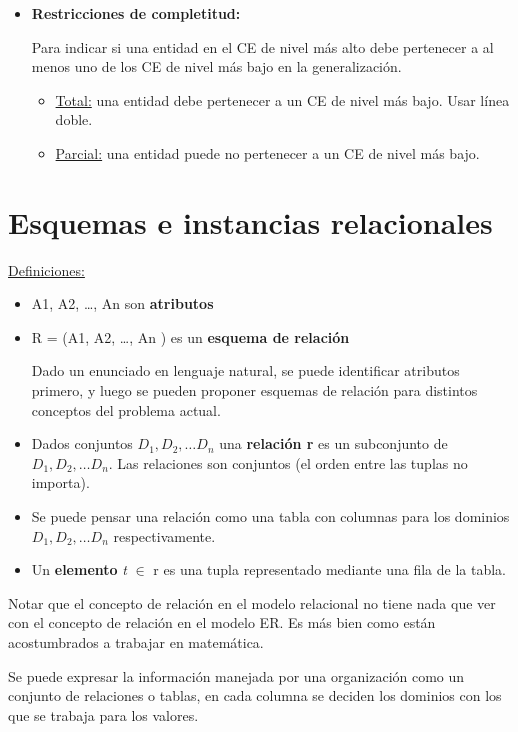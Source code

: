 \documentclass[12pt,a4paper]{report}
\begin{document}
\begin{itemize}
			\item \textbf{Restricciones de completitud:} 
			\par Para indicar si una entidad en el CE de nivel más alto debe pertenecer a al menos uno de los CE de nivel más bajo en la generalización.
				\begin{itemize}
					\item \underline{Total:} una entidad debe pertenecer a un CE de nivel más bajo. Usar línea doble.
					\item \underline{Parcial:} una entidad puede no pertenecer a un CE de nivel más bajo.
				\end{itemize}
		\end{itemize}

	\section{Esquemas e instancias relacionales}
		\underline{Definiciones:}
		\begin{itemize}
			\item A1, A2, …, An son \textbf{atributos}
		 	\item R = (A1, A2, …, An ) es un \textbf{esquema de relación}
		 
		 	\par Dado un enunciado en lenguaje natural, se puede identificar atributos primero, y luego se pueden proponer esquemas de relación para distintos conceptos del problema actual.
			\item Dados conjuntos $D_{1}, D_{2}, \dotsc D_{n}$ una \textbf{relación r} es un subconjunto de $D_{1}, D_{2}, \dotsc D_{n}$. Las relaciones son conjuntos (el orden entre las tuplas no importa).
			\item Se puede pensar una relación como una tabla con columnas para los dominios $D_{1}, D_{2}, \dotsc D_{n}$ respectivamente.
			\item Un \textbf{elemento} \textit{t} $\in$ r es una tupla representado mediante una fila de la tabla.
		\end{itemize}
			\par Notar que el concepto de relación en el modelo relacional no tiene nada que ver con el concepto de relación en el modelo ER. Es más bien como están acostumbrados a trabajar en matemática.
			\par Se puede expresar la información manejada por una organización como un conjunto de relaciones o tablas, en cada columna se deciden los dominios con los que se trabaja para los valores.
			
\end{document}
